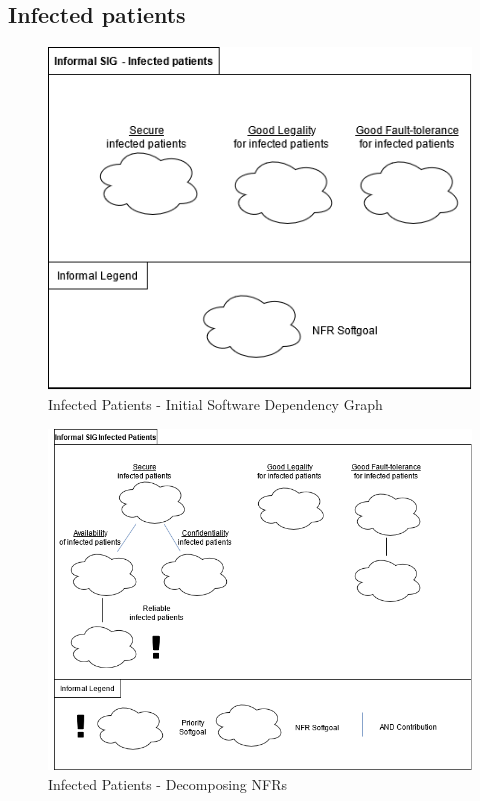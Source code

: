 \documentclass{VUMIFPSkursinis}
\begin{document}
\begin{landscape}
	\subsection{Infected patients}
		\begin{figure}[H]
			\center
			\includegraphics[scale=0.9]{img/Infected-Patients-1}
			\caption{Infected Patients - Initial Software Dependency Graph} %
			\label{img:kurimoProcesas}
		\end{figure}
		\begin{figure}[H]
			\center
			\includegraphics[scale=0.7]{img/Infected-Patients-2}
			\caption{Infected Patients - Decomposing NFRs} %
			\label{img:kurimoProcesas}
		\end{figure}




\end{landscape}
\end{document}
